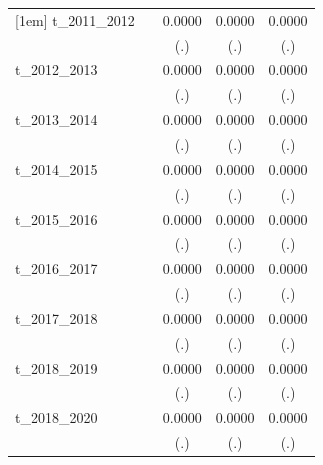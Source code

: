 \begin{table}[htbp]
\begin{tabular}{l*{4}{c}}
[1em]
t\_2011\_2012 &                     &      0.0000         &      0.0000         &      0.0000         \\
            &                     &         (.)         &         (.)         &         (.)         \\
[1em]
t\_2012\_2013 &                     &      0.0000         &      0.0000         &      0.0000         \\
            &                     &         (.)         &         (.)         &         (.)         \\
[1em]
t\_2013\_2014 &                     &      0.0000         &      0.0000         &      0.0000         \\
            &                     &         (.)         &         (.)         &         (.)         \\
[1em]
t\_2014\_2015 &                     &      0.0000         &      0.0000         &      0.0000         \\
            &                     &         (.)         &         (.)         &         (.)         \\
[1em]
t\_2015\_2016 &                     &      0.0000         &      0.0000         &      0.0000         \\
            &                     &         (.)         &         (.)         &         (.)         \\
[1em]
t\_2016\_2017 &                     &      0.0000         &      0.0000         &      0.0000         \\
            &                     &         (.)         &         (.)         &         (.)         \\
[1em]
t\_2017\_2018 &                     &      0.0000         &      0.0000         &      0.0000         \\
            &                     &         (.)         &         (.)         &         (.)         \\
[1em]
t\_2018\_2019 &                     &      0.0000         &      0.0000         &      0.0000         \\
            &                     &         (.)         &         (.)         &         (.)         \\
[1em]
t\_2018\_2020 &                     &      0.0000         &      0.0000         &      0.0000         \\
            &                     &         (.)         &         (.)         &         (.)         \\

\end{tabular}
\end{table}
